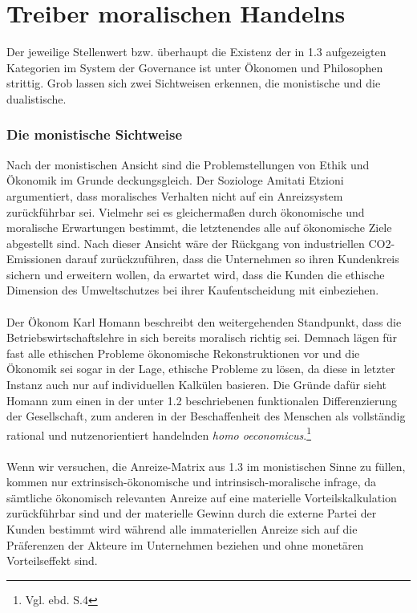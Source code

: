\documentclass[12pt]{article}
\begin{document}
\part{Treiber moralischen Handelns}
Der jeweilige Stellenwert bzw. überhaupt die Existenz der in 1.3 aufgezeigten Kategorien im System der Governance ist unter Ökonomen und Philosophen strittig. Grob lassen sich zwei Sichtweisen erkennen, die monistische und die dualistische.
\section{Die monistische Sichtweise}
Nach der monistischen Ansicht sind die Problemstellungen von Ethik und Ökonomik im Grunde deckungsgleich. Der Soziologe Amitati Etzioni argumentiert, dass moralisches Verhalten nicht auf ein Anreizsystem zurückführbar sei. Vielmehr sei es gleichermaßen durch ökonomische und moralische Erwartungen bestimmt, die letztenendes alle auf ökonomische Ziele abgestellt sind. Nach dieser Ansicht wäre der Rückgang von industriellen CO2-Emissionen darauf zurückzuführen, dass die Unternehmen so ihren Kundenkreis sichern und erweitern wollen, da erwartet wird, dass die Kunden die ethische Dimension des Umweltschutzes bei ihrer Kaufentscheidung mit einbeziehen.\\
\\
Der Ökonom Karl Homann beschreibt den weitergehenden Standpunkt, dass die Betriebswirtschaftslehre in sich bereits moralisch richtig sei. Demnach lägen für fast alle ethischen Probleme ökonomische Rekonstruktionen vor und die Ökonomik sei sogar in der Lage, ethische Probleme zu lösen, da diese in letzter Instanz auch nur auf individuellen Kalkülen basieren. Die Gründe dafür sieht Homann zum einen in der unter 1.2 beschriebenen funktionalen Differenzierung der Gesellschaft, zum anderen in der Beschaffenheit des Menschen als vollständig rational und nutzenorientiert handelnden \textit{homo oeconomicus}.\footnote{Vgl. ebd. S.4}\\
\\
Wenn wir versuchen, die Anreize-Matrix aus 1.3 im monistischen Sinne zu füllen, kommen nur extrinsisch-ökonomische und intrinsisch-moralische infrage, da sämtliche ökonomisch relevanten Anreize auf eine materielle Vorteilskalkulation zurückführbar sind und der materielle Gewinn durch die externe Partei der Kunden bestimmt wird während alle immateriellen Anreize sich auf die Präferenzen der Akteure im Unternehmen beziehen und ohne monetären Vorteilseffekt sind.
\end{document}
